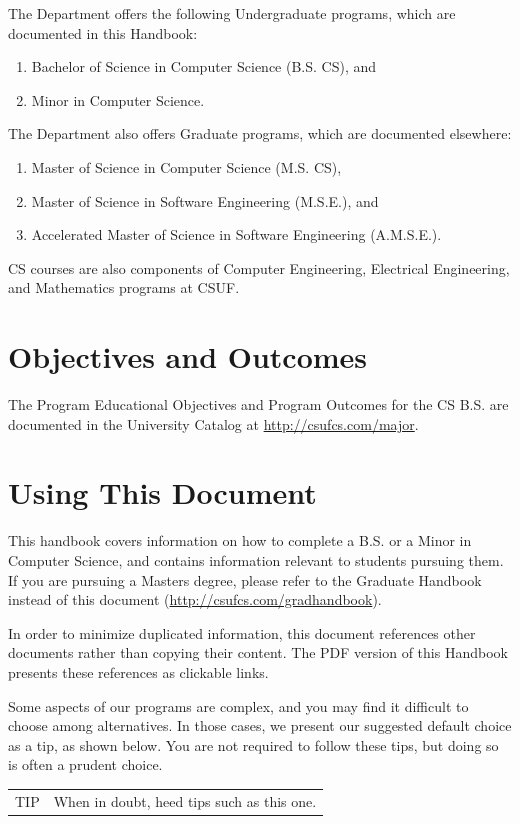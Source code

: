 \documentclass{book}
\newenvironment{tip}{
  \tcolorbox \begin{tabular}{m{.5in} m{5.25in}}
    \Large{TIP} &
}{
  \end{tabular} \endtcolorbox
}
\newcommand{\CampusName}{CSUF}
\newcommand{\shrunkurl}[1]{\url{http://csufcs.com/#1}}
\begin{document}
The Department offers the following Undergraduate programs, which are documented in this Handbook:
\begin{enumerate}
\item Bachelor of Science in Computer Science (B.S. CS), and
\item Minor in Computer Science.
\end{enumerate}

The Department also offers Graduate programs, which are documented elsewhere:
\begin{enumerate}
\item Master of Science in Computer Science (M.S. CS),
\item Master of Science in Software Engineering (M.S.E.), and
\item Accelerated Master of Science in Software Engineering (A.M.S.E.).
\end{enumerate}

CS courses are also components of Computer Engineering, Electrical Engineering, and Mathematics programs at \CampusName.

\section{Objectives and Outcomes}
 
The Program Educational Objectives and Program Outcomes for the CS B.S. are documented in the University Catalog at \shrunkurl{major}.

\section{Using This Document}

This handbook covers information on how to complete a B.S. or a Minor in Computer Science, and contains information relevant to students pursuing them. If you are pursuing a Masters degree, please refer to the Graduate Handbook instead of this document (\shrunkurl{gradhandbook}).

In order to minimize duplicated information, this document references other documents rather than copying their content. The PDF version of this Handbook presents these references as clickable links.

Some aspects of our programs are complex, and you may find it difficult to choose among alternatives. In those cases, we present our suggested default choice as a tip, as shown below. You are not required to follow these tips, but doing so is often a prudent choice.
\begin{tip}
When in doubt, heed tips such as this one.
\end{tip}
\end{document}
